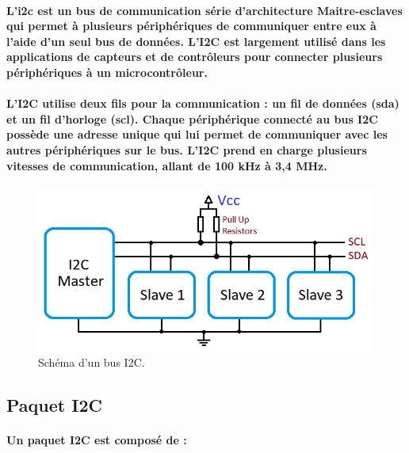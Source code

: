 \paragraph{L'\gls{i2c} est un bus de communication série d'architecture Maitre-esclaves qui permet à plusieurs périphériques de communiquer entre eux à l'aide d'un seul bus de données. L'I2C est largement utilisé dans les applications de capteurs et de contrôleurs pour connecter plusieurs périphériques à un microcontrôleur.}

\paragraph{L'I2C utilise deux fils pour la communication : un fil de données (\acrshort{sda}) et un fil d'horloge (\acrshort{scl}). Chaque périphérique connecté au bus I2C possède une adresse unique qui lui permet de communiquer avec les autres périphériques sur le bus. L'I2C prend en charge plusieurs vitesses de communication, allant de 100 kHz à 3,4 MHz.}

\paragraph*{}
\begin{figure}[!htpb]
	\centering
	\includegraphics[width=\linewidth]{Figures/i2c.png}
	\caption[Schéma d'un bus I2C]{Schéma d'un bus I2C.}
	\label{fig:i2c}
\end{figure}

\subsection{Paquet I2C}

\paragraph{Un paquet I2C est composé de :}

